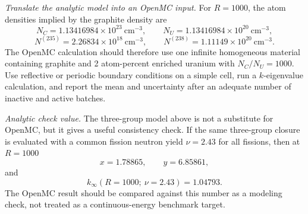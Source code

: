\begin{adaptedsolution}
\noindent\textit{Translate the analytic model into an OpenMC input.}
For $R=1000$, the atom densities implied by the graphite density are
\[
N_C=1.13416984\times10^{23}~\mathrm{cm^{-3}},\qquad
N_U=1.13416984\times10^{20}~\mathrm{cm^{-3}},
\]
\[
N^{(235)}=2.26834\times10^{18}~\mathrm{cm^{-3}},\qquad
N^{(238)}=1.11149\times10^{20}~\mathrm{cm^{-3}}.
\]
The OpenMC calculation should therefore use one infinite homogeneous material
containing graphite and 2 atom-percent enriched uranium with $N_C/N_U=1000$.
Use reflective or periodic boundary conditions on a simple cell, run a
$k$-eigenvalue calculation, and report the mean and uncertainty after an
adequate number of inactive and active batches.

\noindent\textit{Analytic check value.}
The three-group model above is not a substitute for OpenMC, but it gives a
useful consistency check.  If the same three-group closure is evaluated with
a common fission neutron yield $\nu=2.43$ for all fissions, then at $R=1000$
\[
x=1.78865,\qquad y=6.85861,
\]
and
\[
\boxed{k_\infty(R=1000;\ \nu=2.43)=1.04793.}
\]
The OpenMC result should be compared against this number as a modeling check,
not treated as a continuous-energy benchmark target.
\end{adaptedsolution}

\clearpage
